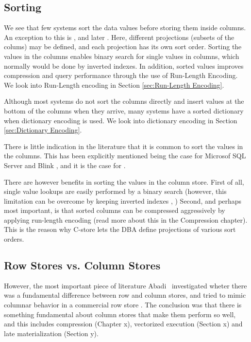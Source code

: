 \subsection{Sorting}
\label{sub:Sorting}
We see that few systems sort the data values before storing them inside columns. An exception to this is \cstore, and later \vertica \cite{Stonebraker2005-qz, Lamb2012-kg}. Here, different projections (subsets of the colums) may be defined, and each projection has its own sort order. Sorting the values in the columns enables binary search for single values in columns, which normally would be done by inverted indexes. In addition, sorted values improves compression and query performance through the use of Run-Length Encoding. We look into Run-Length encoding in Section \ref{sec:Run-Length Encoding}.

Although most systems do not sort the columns directly and insert values at the bottom of the columns when they arrive, many systems have a sorted dictionary when dictionary encoding is used. We look into dictionary encoding in Section \ref{sec:Dictionary Encoding}.

There is little indication in the literature that it is common to sort the values in the columns. This has been explicitly mentioned being the case for Microsof SQL Server \cite{Larson2013-mc} and Blink \cite{Raman2013-em}, and it is the case for .

There are however benefits in sorting the values in the column store. First of all, single value lookups are easily performed by a binary search (however, this limitation can be overcome by keeping inverted indexes \cite{Lemke2010-is}, \cite{Schwalb2014-hn}) Second, and perhaps most important, is that sorted columns can be compressed aggressively by applying run-length encoding (read more about this in the Compression chapter). This is the reason why C-store \cite{Stonebraker2005-qz} lets the DBA define projections of various sort orders.

\subsection{Row Stores vs. Column Stores}
\label{sub:Row Stores vs. Column Stores}
However, the most important piece of literature Abadi \ea~investigated wheter there was a fundamental difference between row and column stores, and tried to mimic columnar behavior in a commercial row store \cite{Abadi2008-dd} . The conclusion was that there is something fundamental about column stores that make them perform so well, and this includes compression (Chapter x), vectorized execution (Section x) and late materialization (Section y). 

